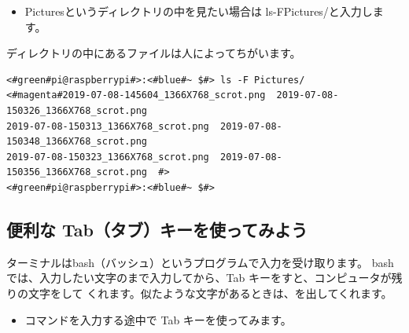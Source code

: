 \begin{itemize}
  \item[<例>] Picturesというディレクトリの中を見たい場合は ls\textvisiblespace -F\textvisiblespace Pictures/と入力します。 
\end{itemize}

ディレクトリの中にあるファイルは人によってちがいます。
\begin{lstlisting}[caption=ls -F Pictures/コマンドの例,label=lsFPicttest]
<#green#pi@raspberrypi#>:<#blue#~ $#> ls -F Pictures/
<#magenta#2019-07-08-145604_1366X768_scrot.png  2019-07-08-150326_1366X768_scrot.png  
2019-07-08-150313_1366X768_scrot.png  2019-07-08-150348_1366X768_scrot.png  
2019-07-08-150323_1366X768_scrot.png  2019-07-08-150356_1366X768_scrot.png  #>
<#green#pi@raspberrypi#>:<#blue#~ $#> 
\end{lstlisting}

\subsection{便利な Tab（タブ）キーを使ってみよう}
ターミナルはbash（バッシュ）というプログラムで入力を受け取ります。
bashでは、入力したい文字のまで入力してから、Tab キーをすと、コンピュータが残りの文字をして
くれます。似たような文字があるときは、を出してくれます。
\newpage
\begin{itemize}
\item[<例>]コマンドを入力する途中で Tab キーを使ってみます。
\end{itemize}

